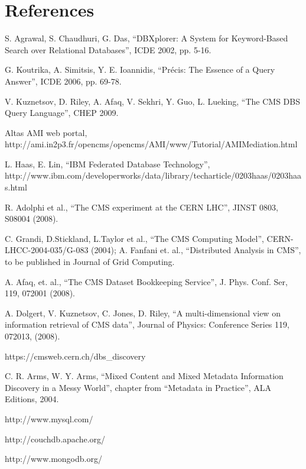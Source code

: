 \documentclass[a4paper]{jpconf}
\begin{document}
\section*{References}
\begin{thebibliography}{9}
S. Agrawal, S. Chaudhuri, G. Das,
``DBXplorer: A System for Keyword-Based Search over Relational Databases'',
ICDE 2002, pp. 5-16.

G. Koutrika, A. Simitsis, Y. E. Ioannidis,
``Pr\'{e}cis: The Essence of a Query Answer'',
ICDE 2006, pp. 69-78.

V. Kuznetsov, D. Riley, A. Afaq, V. Sekhri, Y. Guo, L. Lueking,
``The CMS DBS Query Language'', CHEP 2009.

Altas AMI web portal,
http://ami.in2p3.fr/opencms/opencms/AMI/www/Tutorial/AMIMediation.html

L. Haas, E. Lin,
``IBM Federated Database Technology'', \\
http://www.ibm.com/developerworks/data/library/techarticle/0203haas/0203haas.html

R. Adolphi et al., 
``The CMS experiment at the CERN LHC'',
JINST 0803, S08004 (2008).

C. Grandi, D.Stickland, L.Taylor et al.,
``The CMS Computing Model'',
CERN-LHCC-2004-035/G-083 (2004);
A. Fanfani et. al., 
``Distributed Analysis in CMS'', 
to be published in Journal of Grid Computing.

A. Afaq, et. al.,
``The CMS Dataset Bookkeeping Service'', 
J. Phys. Conf. Ser, 119, 072001 (2008).

A. Dolgert, V. Kuznetsov, C. Jones, D. Riley, 
``A multi-dimensional view on information retrieval of CMS data'',
Journal of Physics: Conference Series 119, 072013, (2008).

 https://cmsweb.cern.ch/dbs\_discovery

C. R. Arms, W. Y. Arms,
 ``Mixed Content and Mixed Metadata 
Information Discovery in a Messy World'',
chapter from ``Metadata in Practice'', ALA Editions, 2004.

http://www.mysql.com/

http://couchdb.apache.org/

http://www.mongodb.org/



\end{thebibliography}
\end{document}
